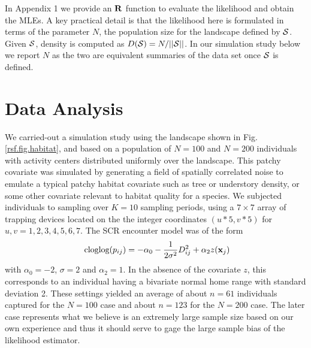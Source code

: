 \documentclass[12pt]{article}
\begin{document}
In
 Appendix 1 we provide an ${\bf R}$ function to
evaluate the likelihood and obtain the MLEs.
A key practical detail
is that the likelihood here is formulated in terms of the parameter
$N$, the population size for the landscape defined by ${\cal
  S}$. Given ${\cal S}$, density is computed as $D({\cal S}) =
N/||{\cal S}||$. In our simulation study below we report $N$ as the
two are equivalent summaries of the data set once ${\cal S}$ is
defined.


\section{Data Analysis}


We carried-out a simulation study using the landscape shown in
Fig. \ref{rsf.fig.habitat}, and based on a population of $N=100$ and $N=200$
individuals with activity centers distributed uniformly over the
landscape.  This patchy covariate was simulated by generating a field
of spatially correlated noise to emulate a typical patchy habitat
covariate such as tree or understory density, or some other covariate
relevant to habitat quality for a species.  We subjected individuals
to sampling over $K=10$ sampling periods, using a $7 \times 7$ array
of trapping devices located on the the integer coordinates $(u*5,v*5)$
for $u,v = 1,2,3,4,5,6,7$. The SCR encounter model was of the form
\[
\mbox{ cloglog}(p_{ij}) = -\alpha_{0}  -\frac{1}{2\sigma^{2}} D_{ij}^{2} + \alpha_{2}  z({\bf x}_{j})
\]
with $\alpha_{0} = -2$,  $\sigma =2$ and $\alpha_{2} = 1$. 
In the absence of the covariate $z$, this corresponds
to an individual having a bivariate normal home range with standard
deviation 2.
These settings yielded an average of about $n=61$ individuals captured for
the $N=100$ case and about $n=123$ for the $N=200$ case. The later case
represents what we believe is an extremely large sample size based on
our own experience and thus it should serve to gage the large sample
bias of the likelihood estimator.
\end{document}
